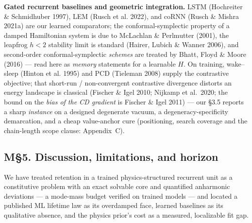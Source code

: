 \documentclass[10pt]{article}
\begin{document}
\textbf{Gated recurrent baselines and geometric integration.} LSTM (Hochreiter \& Schmidhuber 1997), LEM (Rusch et al. 2022), and coRNN (Rusch \& Mishra 2021a) are our learned comparators; the conformal-symplectic property of a damped Hamiltonian system is due to McLachlan \& Perlmutter (2001), the leapfrog $h<2$ stability limit is standard (Hairer, Lubich \& Wanner 2006), and second-order conformal-symplectic \emph{schemes} are treated by Bhatt, Floyd \& Moore (2016) --- read here as \emph{memory} statements for a learnable $H$. On training, wake--sleep (Hinton et al. 1995) and PCD (Tieleman 2008) supply the contrastive objective; that short-run / non-convergent contrastive divergence distorts an energy landscape is classical (Fischer \& Igel 2010; Nijkamp et al.\ 2020; the bound on the \emph{bias of the CD gradient} is Fischer \& Igel 2011) --- our \S3.5 reports a sharp \emph{instance} on a designed degenerate vacuum, a degeneracy-specificity demarcation, and a cheap value-anchor cure (positioning, search coverage and the chain-length scope clause: Appendix~C).


\subsection*{M\S5. Discussion, limitations, and horizon}

We have treated retention in a trained physics-structured recurrent unit as a constitutive problem with an exact solvable core and quantified anharmonic deviations --- a mode-mass budget verified on trained models --- and located a published ML lifetime law as its overdamped face, learned baselines as its qualitative absence, and the physics prior's cost as a measured, localizable fit gap.
\end{document}
